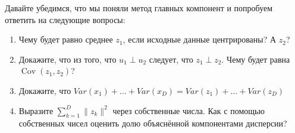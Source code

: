 \documentclass[12pt,fleqn]{article}
\DeclareMathOperator{\Cov}{Cov}
\begin{document}
\begin{vkProblem} Давайте убедимся, что мы поняли метод главных компонент и попробуем ответить на следующие вопросы: 
    \begin{enumerate} 
        \item Чему будет равно среднее $z_1$, если исходные данные центрированы? А $z_2$?
        \item Докажите, что из того, что $u_1 \perp u_2$ следует, что $z_1 \perp z_2$. Чему будет равна $\Cov(z_1, z_2)$?
        \item Докажите, что $Var(x_1) + \ldots + Var(x_D) = Var(z_1) + \ldots + Var(z_D)$
        \item Выразите $\sum_{k=1}^D \|z_k\|^2$ через собственные числа. Как с помощью собственных чисел оценить долю объяснённой компонентами дисперсии?  
    \end{enumerate}
\end{vkProblem}
\end{document}
